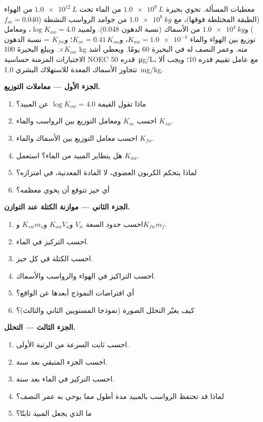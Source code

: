 \begin{problem}
\label{pb:b3:environmental-toxicology:1}
معطيات المسألة. تحوي بحيرة $\qty{1.0e9}{L}$ من الماء تحت $\qty{1.0e12}{L}$ من الهواء (الطبقة المختلطة فوقها)،
مع $\qty{1.0e8}{kg}$ من جوامد الرواسب النشطة ($f_{oc} = 0.040$) و$\qty{1.0e4}{kg}$ من الأسماك (نسبة الدهون 0.048).
ولمبيد $\log K_{ow} = 4.0$، ومعامل توزيع بين الهواء والماء $K_{aw} = \num{1.0e-4}$، و$K_{oc} = 0.41\,K_{ow}$؛
و$K_{fw}$ = نسبة الدهون $\times K_{ow}$. ويبلغ البحيرةَ 100 kg منه. وعمر النصف له في البحيرة 60 يومًا.
ويعطي أشد الاختبارات المزمنة حساسية NOEC قدره \qty{50}{\micro g/L}، مع عامل تقييم قدره 10؛
ويجب ألا تتجاوز الأسماك المعدة للاستهلاك البشري \qty{1.0}{mg/kg}.

\medskip\noindent\textbf{الجزء الأول --- معاملات التوزيع.}
\begin{enumerate}
  \item ماذا تقول القيمة $\log K_{ow} = 4.0$ عن المبيد؟
  \item احسب $K_{oc}$ ومعامل التوزيع بين الرواسب والماء $K_{sw}$.
  \item احسب معامل التوزيع بين الأسماك والماء $K_{fw}$.
  \item هل يتطاير المبيد من الماء؟ استعمل $K_{aw}$.
  \item لماذا يتحكم الكربون العضوي، لا المادة المعدنية، في امتزازه؟
  \item أي حيز تتوقع أن يحوي معظمه؟
\end{enumerate}

\medskip\noindent\textbf{الجزء الثاني --- موازنة الكتلة عند التوازن.}
\begin{enumerate}[resume]
  \item احسب حدود السعة $V_w$ و$K_{aw}V_a$ و$K_{sw}m_s$ و$K_{fw}m_f$.
  \item احسب التركيز في الماء.
  \item احسب الكتلة في كل حيز.
  \item احسب التراكيز في الهواء والرواسب والأسماك.
  \item أي افتراضات النموذج أبعدها عن الواقع؟
  \item كيف يغيّر التحلل الصورة (نموذجا المستويين الثاني والثالث)؟
\end{enumerate}

\medskip\noindent\textbf{الجزء الثالث --- التحلل.}
\begin{enumerate}[resume]
  \item احسب ثابت السرعة من الرتبة الأولى.
  \item احسب الجزء المتبقي بعد سنة.
  \item احسب التركيز في الماء بعد سنة.
  \item لماذا قد تحتفظ الرواسب بالمبيد مدة أطول مما يوحي به عمر النصف؟
  \item ما الذي يجعل المبيد ثابتًا؟
\end{enumerate}


\end{problem}
